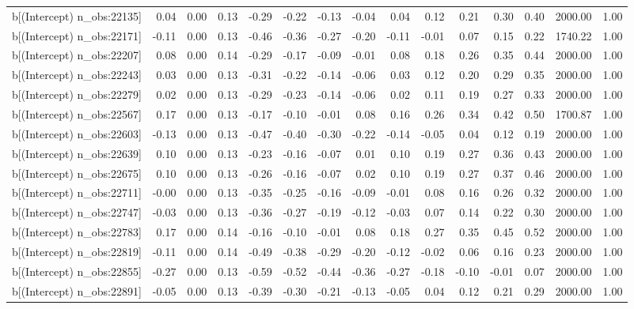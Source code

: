 \begin{table}[ht]
\begin{tabular}{rrrrrrrrrrrrrrr}
  b[(Intercept) n\_obs:22135] & 0.04 & 0.00 & 0.13 & -0.29 & -0.22 & -0.13 & -0.04 & 0.04 & 0.12 & 0.21 & 0.30 & 0.40 & 2000.00 & 1.00 \\ 
  b[(Intercept) n\_obs:22171] & -0.11 & 0.00 & 0.13 & -0.46 & -0.36 & -0.27 & -0.20 & -0.11 & -0.01 & 0.07 & 0.15 & 0.22 & 1740.22 & 1.00 \\ 
  b[(Intercept) n\_obs:22207] & 0.08 & 0.00 & 0.14 & -0.29 & -0.17 & -0.09 & -0.01 & 0.08 & 0.18 & 0.26 & 0.35 & 0.44 & 2000.00 & 1.00 \\ 
  b[(Intercept) n\_obs:22243] & 0.03 & 0.00 & 0.13 & -0.31 & -0.22 & -0.14 & -0.06 & 0.03 & 0.12 & 0.20 & 0.29 & 0.35 & 2000.00 & 1.00 \\ 
  b[(Intercept) n\_obs:22279] & 0.02 & 0.00 & 0.13 & -0.29 & -0.23 & -0.14 & -0.06 & 0.02 & 0.11 & 0.19 & 0.27 & 0.33 & 2000.00 & 1.00 \\ 
  b[(Intercept) n\_obs:22567] & 0.17 & 0.00 & 0.13 & -0.17 & -0.10 & -0.01 & 0.08 & 0.16 & 0.26 & 0.34 & 0.42 & 0.50 & 1700.87 & 1.00 \\ 
  b[(Intercept) n\_obs:22603] & -0.13 & 0.00 & 0.13 & -0.47 & -0.40 & -0.30 & -0.22 & -0.14 & -0.05 & 0.04 & 0.12 & 0.19 & 2000.00 & 1.00 \\ 
  b[(Intercept) n\_obs:22639] & 0.10 & 0.00 & 0.13 & -0.23 & -0.16 & -0.07 & 0.01 & 0.10 & 0.19 & 0.27 & 0.36 & 0.43 & 2000.00 & 1.00 \\ 
  b[(Intercept) n\_obs:22675] & 0.10 & 0.00 & 0.13 & -0.26 & -0.16 & -0.07 & 0.02 & 0.10 & 0.19 & 0.27 & 0.37 & 0.46 & 2000.00 & 1.00 \\ 
  b[(Intercept) n\_obs:22711] & -0.00 & 0.00 & 0.13 & -0.35 & -0.25 & -0.16 & -0.09 & -0.01 & 0.08 & 0.16 & 0.26 & 0.32 & 2000.00 & 1.00 \\ 
  b[(Intercept) n\_obs:22747] & -0.03 & 0.00 & 0.13 & -0.36 & -0.27 & -0.19 & -0.12 & -0.03 & 0.07 & 0.14 & 0.22 & 0.30 & 2000.00 & 1.00 \\ 
  b[(Intercept) n\_obs:22783] & 0.17 & 0.00 & 0.14 & -0.16 & -0.10 & -0.01 & 0.08 & 0.18 & 0.27 & 0.35 & 0.45 & 0.52 & 2000.00 & 1.00 \\ 
  b[(Intercept) n\_obs:22819] & -0.11 & 0.00 & 0.14 & -0.49 & -0.38 & -0.29 & -0.20 & -0.12 & -0.02 & 0.06 & 0.16 & 0.23 & 2000.00 & 1.00 \\ 
  b[(Intercept) n\_obs:22855] & -0.27 & 0.00 & 0.13 & -0.59 & -0.52 & -0.44 & -0.36 & -0.27 & -0.18 & -0.10 & -0.01 & 0.07 & 2000.00 & 1.00 \\ 
  b[(Intercept) n\_obs:22891] & -0.05 & 0.00 & 0.13 & -0.39 & -0.30 & -0.21 & -0.13 & -0.05 & 0.04 & 0.12 & 0.21 & 0.29 & 2000.00 & 1.00 \\ 

\end{tabular}
\end{table}
